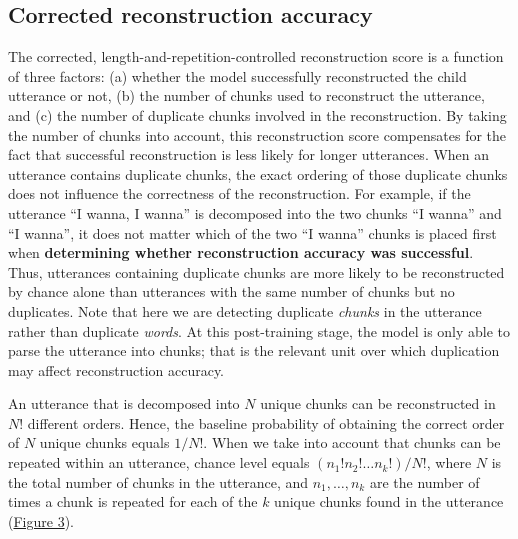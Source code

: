 \documentclass[
  english,
  man,mask,floatsintext]{apa6}
\begin{document}
\hypertarget{corrected-reconstruction-accuracy}{%
\subsection{Corrected reconstruction accuracy}\label{corrected-reconstruction-accuracy}}

The corrected, length-and-repetition-controlled reconstruction score is a function of three factors: (a) whether the model successfully reconstructed the child utterance or not, (b) the number of chunks used to reconstruct the utterance, and (c) the number of duplicate chunks involved in the reconstruction. By taking the number of chunks into account, this reconstruction score compensates for the fact that successful reconstruction is less likely for longer utterances. When an utterance contains duplicate chunks, the exact ordering of those duplicate chunks does not influence the correctness of the reconstruction. For example, if the utterance \enquote{I wanna, I wanna} is decomposed into the two chunks \enquote{I wanna} and \enquote{I wanna}, it does not matter which of the two \enquote{I wanna} chunks is placed first when \textbf{determining whether reconstruction accuracy was successful}. Thus, utterances containing duplicate chunks are more likely to be reconstructed by chance alone than utterances with the same number of chunks but no duplicates. Note that here we are detecting duplicate \emph{chunks} in the utterance rather than duplicate \emph{words}. At this post-training stage, the model is only able to parse the utterance into chunks; that is the relevant unit over which duplication may affect reconstruction accuracy.

An utterance that is decomposed into \(N\) unique chunks can be reconstructed in \(N!\) different orders. Hence, the baseline probability of obtaining the correct order of \(N\) unique chunks equals \(1/N!\). When we take into account that chunks can be repeated within an utterance, chance level equals \((n_1!n_2!\ldots n_k!)/N!\), where \(N\) is the total number of chunks in the utterance, and \(n_1,\ldots,n_k\) are the number of times a chunk is repeated for each of the \(k\) unique chunks found in the utterance (\protect\hyperlink{fig3}{Figure 3}).
\end{document}
